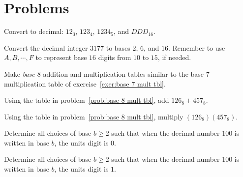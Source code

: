 \section{Problems}

\begin{prob}
Convert to decimal: $12_3$, $123_4$,  $1234_5$, and $DDD_{16}$.
\end{prob}

\begin{prob}
Convert the decimal integer $3177$ to bases $2$, $6$, and $16$.
Remember to use $A,B, \cdots, F$ to represent base $16$ digits from $10$
to $15$, if needed.
\end{prob}

\begin{prob}\label{prob:base 8 mult tbl}
Make \emph{base $8$} addition and multiplication tables similar to the base $7$
multiplication table of exercise~\ref{exer:base 7 mult tbl}.
\end{prob}

\begin{prob}
Using the table in  problem~\ref{prob:base 8 mult tbl}, add  $126_8 + 457_8$.
\end{prob}

\begin{prob}
Using the table in  problem~\ref{prob:base 8 mult tbl}, multiply $(126_8)(457_8)$.
\end{prob}

\begin{prob}
Determine all choices of base $b\geq 2$ such that when the decimal number $100$ is written in
base $b$, the units digit is $0$.
\end{prob}

\begin{prob}
Determine all choices of base $b\geq 2$ such that when the decimal number $100$ is written in
base $b$, the units digit is $1$.
\end{prob}

